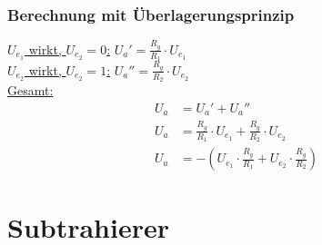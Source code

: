 \subsubsection*{Berechnung mit Überlagerungsprinzip}

\underline{$U_{e_1}$ wirkt, $U_{e_2}=0$:} \hspace{2cm} $U_a'=\frac{R_g}{R_1}\cdot U_{e_1}$ \\

\underline{$U_{e_2}$ wirkt, $U_{e_2}=1$:} \hspace{2cm} $U_a''=\frac{R_g}{R_2}\cdot U_{e_2}$ \\

\underline{Gesamt:}
\begin{align}  
    U_a&=U_a'+U_a''  \\
    U_a&=\frac{R_g}{R_1}\cdot U_{e_1}+\frac{R_g}{R_2}\cdot U_{e_2} \\
    U_a&=-(U_{e_1}\cdot\frac{R_g}{R_1}+U_{e_2}\cdot\frac{R_g}{R_2})
\end{align}

\newpage

\section{Subtrahierer}

